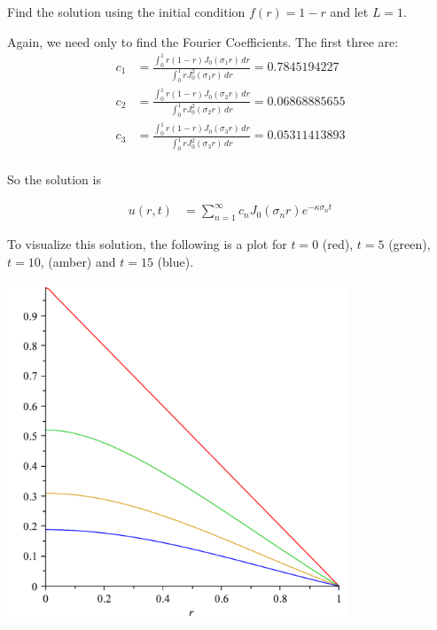 \begin{example}
Find the solution using the initial condition $f(r)=1-r$ and let $L=1$.

\solution

Again, we need only to find the Fourier Coefficients.  The first three are:
%
\begin{align*}
c_1 & = \frac{\int_0^1  r(1-r) J_0(\sigma_1 r) \, dr}{\int_0^1 r J_0^2(\sigma_1 r) \, dr}  = 0.7845194227 \\
c_2 & = \frac{\int_0^1  r(1-r) J_0(\sigma_2 r) \, dr}{\int_0^1 r J_0^2(\sigma_2 r) \, dr}  = 0.06868885655\\
c_3 & = \frac{\int_0^1  r(1-r) J_0(\sigma_3 r) \, dr}{\int_0^1 r J_0^2(\sigma_3 r) \, dr}  = 0.05311413893\\
\end{align*}

So the solution is

\begin{align*}
u(r,t) & = \sum_{n=1}^{\infty}c_n J_0(\sigma_n r) e^{-\kappa \sigma_n t}
\end{align*}

To visualize this solution, the following is a plot for $t=0$ (red), $t=5$ (green), $t=10$, (amber) and $t=15$ (blue).

\begin{center}
\includegraphics[width=4in]{heat-eqn-radially-sym-plot.pdf}
\end{center}

\end{example}






